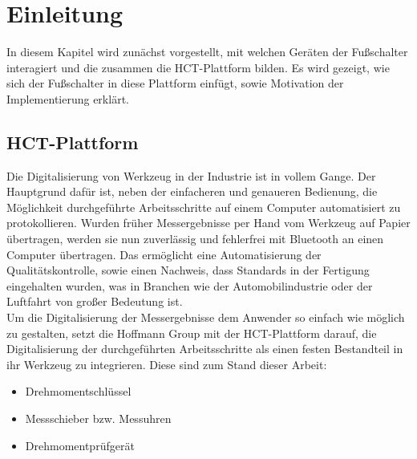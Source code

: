 \section{Einleitung}

In diesem Kapitel wird zunächst vorgestellt, mit welchen Geräten der Fußschalter interagiert und die zusammen die HCT-Plattform bilden. Es wird gezeigt, wie sich der Fußschalter in diese Plattform einfügt, sowie Motivation der Implementierung erklärt.

\subsection{HCT-Plattform}
Die Digitalisierung von Werkzeug in der Industrie ist in vollem Gange. Der Hauptgrund dafür ist, neben der einfacheren und genaueren Bedienung, die Möglichkeit durchgeführte Arbeitsschritte auf einem Computer automatisiert zu protokollieren. Wurden früher Messergebnisse per Hand vom Werkzeug auf Papier übertragen, werden sie nun zuverlässig und fehlerfrei mit Bluetooth an einen Computer übertragen. Das ermöglicht eine Automatisierung der Qualitätskontrolle, sowie einen Nachweis, dass Standards in der Fertigung eingehalten wurden, was in Branchen wie der Automobilindustrie oder der Luftfahrt von großer Bedeutung ist. \\
Um die Digitalisierung der Messergebnisse dem Anwender so einfach wie möglich zu gestalten, setzt die Hoffmann Group mit der HCT-Plattform darauf, die Digitalisierung der durchgeführten Arbeitsschritte als einen festen Bestandteil in ihr Werkzeug zu integrieren. Diese sind zum Stand dieser Arbeit: 
\begin{itemize}
	\item Drehmomentschlüssel
	\item Messschieber bzw. Messuhren
	\item Drehmomentprüfgerät
\end{itemize}

